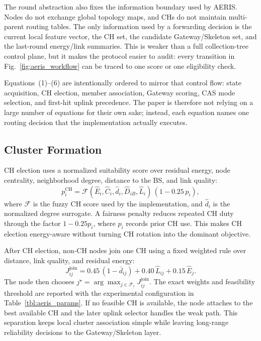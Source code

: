 \documentclass[conference]{IEEEtran}
\begin{document}
The round abstraction also fixes the information boundary used by AERIS. Nodes do not exchange global topology maps, and CHs do not maintain multi-parent routing tables. The only information used by a forwarding decision is the current local feature vector, the CH set, the candidate Gateway/Skeleton set, and the last-round energy/link summaries. This is weaker than a full collection-tree control plane, but it makes the protocol easier to audit: every transition in Fig.~\ref{fig:aeris_workflow} can be traced to one score or one eligibility check.

Equations~(1)--(6) are intentionally ordered to mirror that control flow: state acquisition, CH election, member association, Gateway scoring, CAS mode selection, and first-hit uplink precedence. The paper is therefore not relying on a large number of equations for their own sake; instead, each equation names one routing decision that the implementation actually executes.

\subsection{Cluster Formation}
CH election uses a normalized suitability score over residual energy, node centrality, neighborhood degree, distance to the BS, and link quality:
\begin{equation}
p_i^{\mathrm{CH}}=\mathcal{F}(\hat{E}_i,\hat{C}_i,\hat{d}_i,\hat{D}_{iB},\hat{L}_i)\,(1-0.25\,p_i),
\end{equation}
where $\mathcal{F}$ is the fuzzy CH score used by the implementation, and $\hat{d}_i$ is the normalized degree surrogate. A fairness penalty reduces repeated CH duty through the factor $1-0.25p_i$, where $p_i$ records prior CH use. This makes CH election energy-aware without turning CH rotation into the dominant objective.

After CH election, non-CH nodes join one CH using a fixed weighted rule over distance, link quality, and residual energy:
\begin{equation}
J_{ij}^{\mathrm{join}}=0.45\,(1-\bar{d}_{ij})+0.40\,\hat{L}_{ij}+0.15\,\hat{E}_j .
\end{equation}
The node then chooses $j^\star=\arg\max_{j\in\mathcal{F}_i}J_{ij}^{\mathrm{join}}$. The exact weights and feasibility threshold are reported with the experimental configuration in Table~\ref{tbl:aeris_params}. If no feasible CH is available, the node attaches to the best available CH and the later uplink selector handles the weak path. This separation keeps local cluster association simple while leaving long-range reliability decisions to the Gateway/Skeleton layer.
\end{document}

